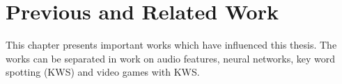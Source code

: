 
\chapter{Previous and Related Work}\label{sec:prev}
\thesisStateRevised
This chapter presents important works which have influenced this thesis.
The works can be separated in work on audio features, neural networks, key word spotting (KWS) and video games with KWS.







